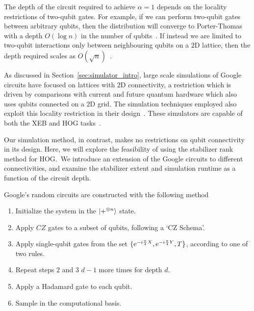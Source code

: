 The depth of the circuit required to achieve $\alpha=1$ depends on the locality restrictions of two-qubit gates. For example, if we can perform two-qubit gates between arbitrary qubits, then the distribution will converge to Porter-Thomas with a depth $O(\log{n})$ in the number of qubits~\cite{Emerson2098,Boixo2016}. If instead we are limited to two-qubit interactions only between neighbouring qubits on a $2$D lattice, then the depth required scales as $O(\sqrt{n})$~\cite{Harrow2018}.\par
As discussed in Section~\ref{sec:simulator_intro}, large scale simulations of Google circuits have focused on lattices with $2$D connectivity, a restriction which is driven by comparisons with current and future quantum hardware which also uses qubits connected on a $2$D grid. The simulation techniques employed also exploit this locality restriction in their design~\cite{Pendault2017,Chen2018b,Markov2018,Villalonga2019}. These simulators are capable of both the XEB and HOG tasks~\cite{Villalonga2019}.\par
Our simulation method, in contrast, makes no restrictions on qubit connectivity in its design. Here, we will explore the feasibility of using the stabilizer rank method for HOG.\ We introduce an extension of the Google circuits to different connectivities, and examine the stabilizer extent and simulation runtime as a function of the circuit depth.\par
Google's random circuits are constructed with the following method
\begin{enumerate}
    \item Initialize the system in the $\ket{+^{\otimes n}}$ state.
    \item Apply $CZ$ gates to a subset of qubits, following a `CZ Schema'.
    \item Apply single-qubit gates from the set $\{\mathrm{e}^{-i\frac{\pi}{4}X},\mathrm{e}^{-i\frac{\pi}{4}Y},T\}$, according to one of two rules.
    \item Repeat steps $2$ and $3$ $d-1$ more times for depth $d$.
    \item Apply a Hadamard gate to each qubit.
    \item Sample in the computational basis.
\end{enumerate}
